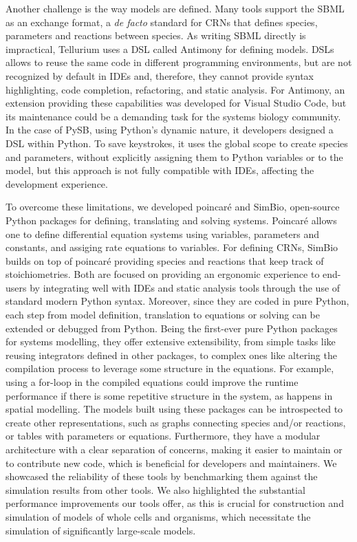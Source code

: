 \documentclass[namedate,numsec,webpdf,modern,large]{oup-authoring-template}
\theoremstyle{thmstyleone}%
\theoremstyle{thmstyletwo}%
\theoremstyle{thmstylethree}%
\begin{document}
Another challenge is the way models are defined.
Many tools support the \ac{SBML} \citep{huckaSBMLL3V2} as an exchange format,
a \emph{de facto} standard for \acp{CRN} that defines species, parameters and reactions between species.
As writing \ac{SBML} directly is impractical,
Tellurium uses a \ac{DSL} called Antimony \citep{smithAntimonyModularModel2009} for defining models.
\Acp{DSL} allows to reuse the same code in different programming environments,
but are not recognized by default in \acp{IDE}
and, therefore, they cannot provide syntax highlighting, code completion, refactoring, and static analysis.
For Antimony, an extension providing these capabilities was developed for Visual Studio Code,
but its maintenance could be a demanding task for the systems biology community.
In the case of PySB,
using Python's dynamic nature,
it developers designed a \ac{DSL} within Python.
To save keystrokes,
it uses the global scope to create species and parameters,
without explicitly assigning them to Python variables or to the model,
but this approach is not fully compatible with \acp{IDE},
affecting the development experience.

To overcome these limitations,
we developed poincaré and SimBio,
open-source Python packages for defining, translating and solving systems.
Poincaré allows one to define differential equation systems
using variables, parameters and constants,
and assiging rate equations to variables.
For defining \acp{CRN},
SimBio builds on top of poincaré providing species and reactions that keep track of stoichiometries.
Both are focused on providing an ergonomic experience to end-users
by integrating well with \acp{IDE} and static analysis tools
through the use of standard modern Python syntax.
Moreover, since they are coded in pure Python,
each step from model definition, translation to equations or solving
can be extended or debugged from Python.
Being the first-ever pure Python packages for systems modelling,
they offer extensive extensibility,
from simple tasks like reusing integrators defined in other packages,
to complex ones like altering the compilation process to leverage some structure in the equations.
For example, using a for-loop in the compiled equations could improve the runtime performance
if there is some repetitive structure in the system,
as happens in spatial modelling.
The models built using these packages can be introspected to create other representations,
such as graphs connecting species and/or reactions, or tables with parameters or equations.
Furthermore, they have a modular architecture with a clear separation of concerns,
making it easier to maintain or to contribute new code,
which is beneficial for developers and maintainers.
We showcased the reliability of these tools by benchmarking them against the simulation results from other tools.
We also highlighted the substantial performance improvements our tools offer,
as this is crucial for construction and simulation of models of whole cells and organisms,
which necessitate the simulation of significantly large-scale models.
\end{document}
